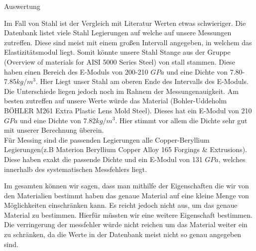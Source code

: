 \documentclass[twoside]{protokoll}
\begin{document}
\begin{aufgabe}{Auswertung}
 
Im Fall von Stahl ist der Vergleich mit Literatur Werten etwas schwieriger. 
Die Datenbank listet viele Stahl Legierungen auf welche auf unsere Messungen zutreffen.
Diese sind meist mit einem großen Intervall angegeben, in welchem das Elastizitätsmodul liegt.
Somit könnte unsere Stahl Stange aus der Gruppe (Overview of materials for AISI 5000 Series Steel) von stall stammen. Diese haben einen Bereich des E-Moduls von 200-210 $GPa$ und eine Dichte von 7.80-7.85$kg/m^3$. Hier Liegt unser Stahl am oberen Ende des Intervalls des E-Moduls. Die Unterschiede liegen jedoch noch im Rahnem der Messungenauigkeit. 
Am besten zutreffen auf unsere Werte würde das Material (Bohler-Uddeholm BÖHLER M261 Extra Plastic Lens Mold Steel). Dieses hat ein E-Modul von 210 $GPa$ und eine Dichte von
7.82$kg/m^3$. Hier stimmt vor allem die Dichte sehr gut mit unserer Berechnung überein.\\
 
Für Messing sind die passenden Legierungen alle Copper-Beryllium Legierungen(z.B Materion Beryllium Copper Alloy 165 Forgings \& Extrusions).
Diese haben exakt die passende Dichte und ein E-Modul von 131 $GPa$, welches innerhalb des systematischen Messfehlers liegt.
 
Im gesamten können wir sagen, dass man mithilfe der Eigenschaften die wir von den Materialien bestimmt haben das genaue Material auf eine kleine Menge von Möglichkeiten einschränken kann. 
Es reicht jedoch nicht aus, um das genaue Material zu bestimmen. Hierfür müssten wir 
eine weitere Eigenschaft bestimmen. Die verringerung der messfehler würde nicht reichen
um das Material weiter ein zu schränken, da die Werte in der Datenbank meist nicht so genau angegeben sind. 
\end{aufgabe}



\end{document}
